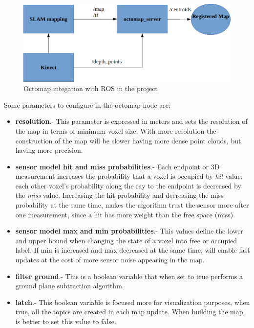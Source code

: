 \documentclass[fontsize=12pt]{article}
\begin{document}
\begin{figure}[H]
\begin{center}
\includegraphics[width=0.8\linewidth]{images/diagocto}
\caption{Octomap integation with ROS in the project}
\label{fig:OctowithROS}
\end{center}
\end{figure}
Some parameters to configure in the octomap node are:
\begin{itemize}
\item \textbf{resolution}.- This parameter is expressed in meters and sets the resolution of the map in terms of minimum voxel size. With more resolution the construction  of the map will be slower having more dense point clouds, but having more precision.   
\item \textbf{sensor model hit and miss probabilities}.- Each endpoint or 3D measurement increases the probability that a voxel is occupied by \textit{hit} value, each other voxel's probability along the ray to the endpoint is decreased by the \textit{miss} value. Increasing the hit probability and decreasing the miss probability at the same time, makes the algorithm trust the sensor more after one measurement, since a hit has more weight than the free space (miss).
\item \textbf{sensor model max and min probabilities}.- This values define the lower and upper bound when changing the state of a voxel into free or occupied label. If min is increased and  max decreased at the same time, will enable fast updates at the cost of more sensor noise appearing in the map.
\item \textbf{filter ground}.- This is a boolean variable that when set to true performs a ground plane subtraction algorithm. 
\item \textbf{latch}.- This boolean variable is focused more for visualization purposes, when true, all the topics are created in each map update. When building the map, is better to set this value to false. 
\end{itemize}
\end{document}
